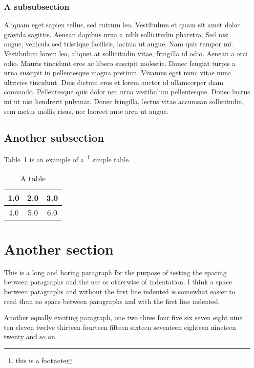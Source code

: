\subsubsection{A subsubsection}

Aliquam eget sapien tellus, sed rutrum leo. Vestibulum et quam sit amet dolor gravida sagittis. Aenean dapibus urna a nibh sollicitudin pharetra. Sed nisi augue, vehicula sed tristique facilisis, lacinia ut augue. Nam quis tempor mi. Vestibulum lorem leo, aliquet at sollicitudin vitae, fringilla id odio. Aenean a orci odio. Mauris tincidunt eros ac libero suscipit molestie. Donec feugiat turpis a urna suscipit in pellentesque magna pretium. Vivamus eget nunc vitae nunc ultricies tincidunt. Duis dictum eros et lorem auctor id ullamcorper diam commodo. Pellentesque quis dolor nec urna vestibulum pellentesque. Donec luctus mi ut nisi hendrerit pulvinar. Donec fringilla, lectus vitae accumsan sollicitudin, sem metus mollis risus, nec laoreet ante arcu ut augue.

\subsection{Another subsection}

Table~\ref{tab:atable} is an example of a~\footnote{this is a
footnote} simple table.

\begin{table}[htb]
\begin{center}
\begin{tabular}{|c|c|c|}
\hline
1.0 & 2.0 & 3.0 \\
\hline
4.0 & 5.0 & 6.0 \\
\hline
\end{tabular}
\caption{A table}
\label{tab:atable}
\end{center}
\end{table}


\section{Another section}

This is a long and boring paragraph for the purpose of testing the
spacing between paragraphs and the use or otherwise of indentation. I
think a space between paragraphs and without the first line indented
is somewhat easier to read than no space between paragraphs and with
the first line indented.

Another equally exciting paragraph, one two three four five six seven
eight nine ten eleven twelve thirteen fourteen fifteen sixteen
seventeen eighteen nineteen twenty and so on.


